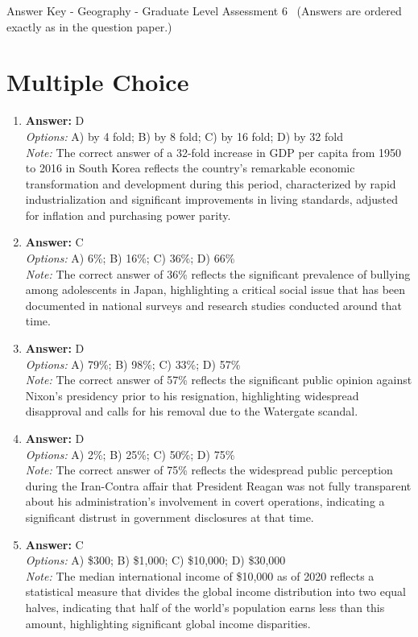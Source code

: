 \documentclass[12pt]{article}
\begin{document}
\begin{center}
Answer Key - Geography - Graduate Level Assessment 6 \
\small (Answers are ordered exactly as in the question paper.)
\end{center}

\section*{Multiple Choice}
\begin{enumerate}[label=\arabic*.]
\item \textbf{Answer:} D
\\ \textit{Options:} A) by 4 fold; B) by 8 fold; C) by 16 fold; D) by 32 fold
\\ \textit{Note:} The correct answer of a 32-fold increase in GDP per capita from 1950 to 2016 in South Korea reflects the country's remarkable economic transformation and development during this period, characterized by rapid industrialization and significant improvements in living standards, adjusted for inflation and purchasing power parity.
\item \textbf{Answer:} C
\\ \textit{Options:} A) 6\%; B) 16\%; C) 36\%; D) 66\%
\\ \textit{Note:} The correct answer of 36\% reflects the significant prevalence of bullying among adolescents in Japan, highlighting a critical social issue that has been documented in national surveys and research studies conducted around that time.
\item \textbf{Answer:} D
\\ \textit{Options:} A) 79\%; B) 98\%; C) 33\%; D) 57\%
\\ \textit{Note:} The correct answer of 57\% reflects the significant public opinion against Nixon's presidency prior to his resignation, highlighting widespread disapproval and calls for his removal due to the Watergate scandal.
\item \textbf{Answer:} D
\\ \textit{Options:} A) 2\%; B) 25\%; C) 50\%; D) 75\%
\\ \textit{Note:} The correct answer of 75\% reflects the widespread public perception during the Iran-Contra affair that President Reagan was not fully transparent about his administration's involvement in covert operations, indicating a significant distrust in government disclosures at that time.
\item \textbf{Answer:} C
\\ \textit{Options:} A) \$300; B) \$1,000; C) \$10,000; D) \$30,000
\\ \textit{Note:} The median international income of \$10,000 as of 2020 reflects a statistical measure that divides the global income distribution into two equal halves, indicating that half of the world's population earns less than this amount, highlighting significant global income disparities.
\end{enumerate}
\end{document}
